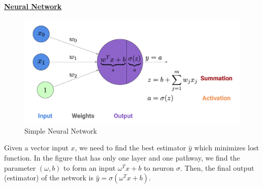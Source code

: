 \documentclass[11pt,a4paper]{article}
\begin{document}
\underline{\textbf{Neural Network}}
\begin{center}\begin{figure}[htbp]
    \centering
    \includegraphics[scale=0.2]{neuron1.png}
    \caption{Simple Neural Network}
    \label{}
\end{figure}\end{center}
Given a vector input $x$, we need to find the best estimator $\hat{y}$ which minimizes lost function. In the figure that has only one layer and one pathway, we find the parameter $(\omega,b)$ to form an input $\omega^Tx+b$ to neuron $\sigma$.  Then, the final output (estimator) of the network is $\hat{y}=\sigma(\omega^Tx+b)$.
\end{document}
